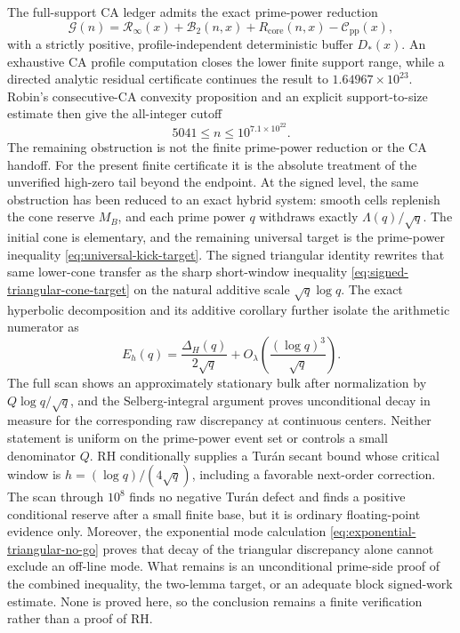 \documentclass[11pt,a4paper]{article}
\numberwithin{equation}{section}
\theoremstyle{definition}
\newcommand{\Rinf}{\mathcal R_{\infty}}
\newcommand{\Btwo}{\mathcal B_{2}}
\newcommand{\Cpi}{\mathcal C_{\mathrm{pp}}}
\newcommand{\Ggap}{\mathcal G}
\begin{document}
The full-support CA ledger admits the exact prime-power reduction
\[
  \Ggap(n)
  =
  \Rinf(x)+\Btwo(n,x)
  +R_{\mathrm{core}}(n,x)-\Cpi(x),
\]
with a strictly positive, profile-independent deterministic buffer \(D_*(x)\).
An exhaustive CA profile computation closes the lower finite support range,
while a directed analytic residual certificate continues the result to
\(1.64967\times10^{23}\).  Robin's consecutive-CA convexity proposition and
an explicit support-to-size estimate then give the all-integer cutoff
\[
  5041\le n\le10^{7.1\times10^{22}}.
\]
The remaining obstruction is not the finite prime-power reduction or the CA
handoff.  For the present finite certificate it is the absolute treatment of
the unverified high-zero tail beyond the endpoint.  At the signed level, the
same obstruction has been reduced to an exact hybrid system: smooth cells
replenish the cone reserve \(M_B\), and each prime power \(q\) withdraws
exactly \(\Lambda(q)/\sqrt q\).  The initial cone is elementary, and the
remaining universal target is the prime-power inequality
\eqref{eq:universal-kick-target}.  The signed triangular identity rewrites
that same lower-cone transfer as the sharp short-window inequality
\eqref{eq:signed-triangular-cone-target} on the natural additive scale
\(\sqrt q\log q\).  The exact hyperbolic decomposition and its additive
corollary further isolate the arithmetic numerator as
\[
 E_h(q)=\frac{\Delta_H(q)}{2\sqrt q}
 +O_\lambda\!\left(\frac{(\log q)^3}{\sqrt q}\right).
\]
The full scan shows an approximately stationary bulk after normalization by
\(Q\log q/\sqrt q\), and the Selberg-integral argument proves unconditional
decay in measure for the corresponding raw discrepancy at continuous
centers.  Neither statement is uniform on the prime-power event set or
controls a small denominator \(Q\).  RH conditionally supplies a Tur\'an
secant bound whose
critical window is \(h=(\log q)/(4\sqrt q)\), including a favorable
next-order correction.  The scan through \(10^8\) finds no negative Tur\'an
defect and finds a positive conditional reserve after a small finite base,
but it is ordinary floating-point evidence only.  Moreover, the exponential
mode calculation \eqref{eq:exponential-triangular-no-go} proves that decay of
the triangular discrepancy alone cannot exclude an off-line mode.  What
remains is an unconditional prime-side proof of the combined inequality, the
two-lemma target, or an adequate block signed-work estimate.  None is proved
here, so the conclusion remains a finite verification rather than a proof of
RH.
\end{document}
